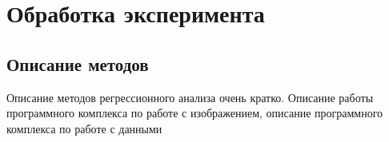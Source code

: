 \chapter{Обработка эксперимента}

\section{Описание методов}
Описание методов регрессионного анализа очень кратко. Описание работы программного комплекса по работе с изображением, описание программного комплекса по работе с данными